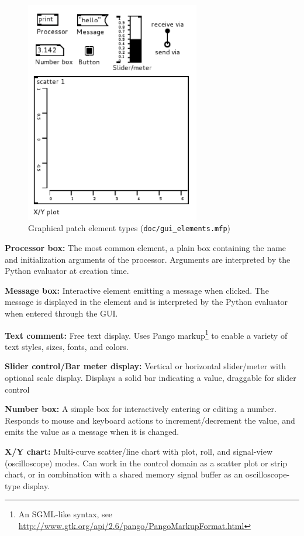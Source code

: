 \documentclass[11pt,a4paper]{article}
\begin{document}
\begin{figure}
    \centering\includegraphics[width=3in]{gui_elements.png}
    \caption{Graphical patch element types (\texttt{doc/gui\_elements.mfp})}
\end{figure}


\textbf{Processor box:} The most common element, a plain box containing the name
and initialization arguments of the processor.  Arguments are interpreted
by the Python evaluator at creation time.

\textbf{Message box:} Interactive element emitting a message when clicked.
The message is displayed in the element and is interpreted by the Python
evaluator when entered through the GUI.

\textbf{Text comment:}  Free text display.  Uses Pango 
markup\footnote{An SGML-like syntax, see 
\url{http://www.gtk.org/api/2.6/pango/PangoMarkupFormat.html}} 
to enable a variety of text styles, sizes, fonts, and colors.

\textbf{Slider control/Bar meter display:} Vertical or horizontal
slider/meter with optional scale display.  Displays a solid bar indicating
a value, draggable for slider control 

\textbf{Number box:} A simple box for interactively entering or editing a
number.  Responds to mouse and keyboard actions to increment/decrement the
value, and emits the value as a message when it is changed. 

\textbf{X/Y chart:} Multi-curve scatter/line chart with plot, roll, and
signal-view (oscilloscope) modes.  Can work in the control domain as a
scatter plot or strip chart, or in combination with a shared memory signal
buffer as an oscilloscope-type display.
\end{document}
